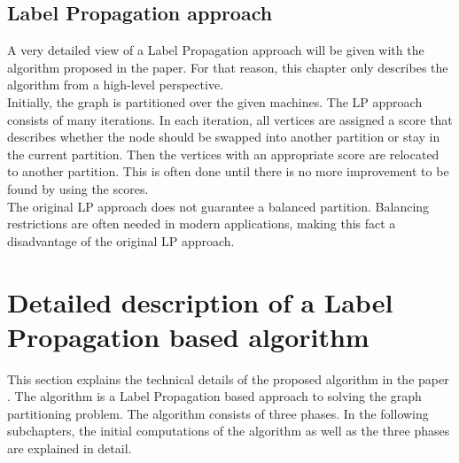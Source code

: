 \documentclass[acmsmall,nonacm,screen,review]{acmart}
\begin{document}
\subsection{Label Propagation approach}
A very detailed view of a Label Propagation approach will be given with the algorithm proposed in the paper. For that reason, this chapter only describes the algorithm from a high-level perspective. \\
Initially, the graph is partitioned over the given machines. The LP approach consists of many iterations. In each iteration, all vertices are assigned a score that describes whether the node should be swapped into another partition or stay in the current partition. Then the vertices with an appropriate score are relocated to another partition. This is often done until there is no more improvement to be found by using the scores. \\
The original LP approach does not guarantee a balanced partition. Balancing restrictions are often needed in modern applications, making this fact a disadvantage of the original LP approach.
\section{Detailed description of a Label Propagation based algorithm}
This section explains the technical details of the proposed algorithm in the paper \cite{Main}. The algorithm is a Label Propagation based approach to solving the graph partitioning problem. The algorithm consists of three phases. In the following subchapters, the initial computations of the algorithm as well as the three phases are explained in detail.
\end{document}
